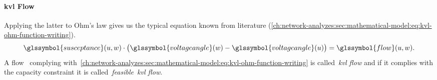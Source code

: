 \paragraph{\gls{kvl} Flow}
\label{ch:network-analyzes:sec:mathematical-model:paragraph:kvl-flow}
% 
Applying the latter to Ohm's law gives us the typical equation
known from literature
(\cref{ch:network-analyzes:sec:mathematical-model:eq:kvl-ohm-function-writing}).
%
\begin{align}
    \glssymbol{susceptance}(\vertexa,\vertexc)
    \cdot
    \big(\glssymbol{voltageangle}(\vertexc)
    -
    \glssymbol{voltageangle}(\vertexa)
    \big) = \glssymbol{flow}(\vertexa,\vertexc).
    \label{ch:network-analyzes:sec:mathematical-model:eq:kvl-ohm-function-writing}
\end{align}
%
A flow~ complying
with~\cref{ch:network-analyzes:sec:mathematical-model:eq:kvl-ohm-function-writing}
is called~\emph{\gls{kvl} flow} and if it complies with the capacity constraint
it is called~\emph{feasible~\gls{kvl} flow}. 

